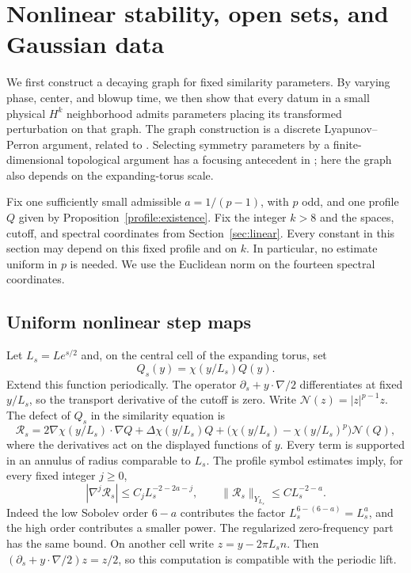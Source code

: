 \section{Nonlinear stability, open sets, and Gaussian data}
\label{sec:nonlinear}

We first construct a decaying graph for fixed similarity parameters.
By varying phase, center, and blowup time, we then show that every datum
in a small physical $H^k$ neighborhood admits parameters placing its
transformed perturbation on that graph.
The graph construction is a discrete Lyapunov--Perron argument,
related to \cite[Proposition~4.8]{BuckEtAl2026}. Selecting symmetry
parameters by a finite-dimensional topological argument has a focusing
antecedent in \cite[Section~6.3]{Li2023}; here the graph also depends
on the expanding-torus scale.

Fix one sufficiently small admissible $a=1/(p-1)$, with $p$ odd, and one
profile $Q$ given by Proposition~\ref{profile:existence}. Fix the integer
$k>8$ and the spaces, cutoff, and spectral coordinates from
Section~\ref{sec:linear}. Every constant in this section may depend on this
fixed profile and on $k$. In particular, no estimate uniform in $p$ is needed.
We use the Euclidean norm on the fourteen spectral coordinates.

\subsection{Uniform nonlinear step maps}

Let $L_s=L e^{s/2}$ and, on the central cell of the expanding torus, set
\[
 Q_s(y)=\chi(y/L_s)Q(y).
\]
Extend this function periodically. The operator
$\partial_s+y\cdot\nabla/2$ differentiates at fixed $y/L_s$, so the
transport derivative of the cutoff is zero. Write
$\mathcal N(z)=|z|^{p-1}z$. The defect of $Q_s$ in the similarity equation is
\begin{equation}\label{nl:residual-formula}
 \mathcal R_s
 =2\nabla\chi(y/L_s)\cdot\nabla Q
   +\Delta\chi(y/L_s)Q
   +\bigl(\chi(y/L_s)-\chi(y/L_s)^p\bigr)\mathcal N(Q),
\end{equation}
where the derivatives act on the displayed functions of $y$.
Every term is supported in an annulus of radius comparable to $L_s$.
The profile symbol estimates imply, for every fixed integer $j\geq0$,
\[
 |\nabla^j\mathcal R_s|\leq C_j L_s^{-2-2a-j},
 \qquad
 \|\mathcal R_s\|_{Y_{L_s}}\leq C L_s^{-2-a}.
\]
Indeed the low Sobolev order $6-a$ contributes the factor
$L_s^{6-(6-a)}=L_s^a$, and the high order contributes a smaller power.
The regularized zero-frequency part has the same bound. On another cell
write $z=y-2\pi L_s n$. Then
$(\partial_s+y\cdot\nabla/2)z=z/2$, so this computation is compatible
with the periodic lift.

